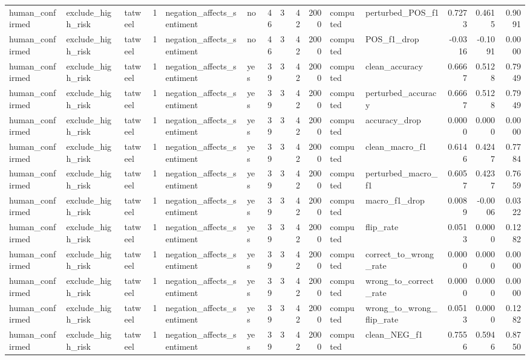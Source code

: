 \begin{tabular}{lllrllrrrrllrrr}
human_confirmed & exclude_high_risk & tatweel & 1 & negation_affects_sentiment & no & 46 & 3 & 42 & 2000 & computed & perturbed_POS_f1 & 0.7273 & 0.4615 & 0.9091 \\
human_confirmed & exclude_high_risk & tatweel & 1 & negation_affects_sentiment & no & 46 & 3 & 42 & 2000 & computed & POS_f1_drop & -0.0316 & -0.1091 & 0.0000 \\
human_confirmed & exclude_high_risk & tatweel & 1 & negation_affects_sentiment & yes & 39 & 3 & 42 & 2000 & computed & clean_accuracy & 0.6667 & 0.5128 & 0.7949 \\
human_confirmed & exclude_high_risk & tatweel & 1 & negation_affects_sentiment & yes & 39 & 3 & 42 & 2000 & computed & perturbed_accuracy & 0.6667 & 0.5128 & 0.7949 \\
human_confirmed & exclude_high_risk & tatweel & 1 & negation_affects_sentiment & yes & 39 & 3 & 42 & 2000 & computed & accuracy_drop & 0.0000 & 0.0000 & 0.0000 \\
human_confirmed & exclude_high_risk & tatweel & 1 & negation_affects_sentiment & yes & 39 & 3 & 42 & 2000 & computed & clean_macro_f1 & 0.6146 & 0.4247 & 0.7784 \\
human_confirmed & exclude_high_risk & tatweel & 1 & negation_affects_sentiment & yes & 39 & 3 & 42 & 2000 & computed & perturbed_macro_f1 & 0.6057 & 0.4237 & 0.7659 \\
human_confirmed & exclude_high_risk & tatweel & 1 & negation_affects_sentiment & yes & 39 & 3 & 42 & 2000 & computed & macro_f1_drop & 0.0089 & -0.0006 & 0.0322 \\
human_confirmed & exclude_high_risk & tatweel & 1 & negation_affects_sentiment & yes & 39 & 3 & 42 & 2000 & computed & flip_rate & 0.0513 & 0.0000 & 0.1282 \\
human_confirmed & exclude_high_risk & tatweel & 1 & negation_affects_sentiment & yes & 39 & 3 & 42 & 2000 & computed & correct_to_wrong_rate & 0.0000 & 0.0000 & 0.0000 \\
human_confirmed & exclude_high_risk & tatweel & 1 & negation_affects_sentiment & yes & 39 & 3 & 42 & 2000 & computed & wrong_to_correct_rate & 0.0000 & 0.0000 & 0.0000 \\
human_confirmed & exclude_high_risk & tatweel & 1 & negation_affects_sentiment & yes & 39 & 3 & 42 & 2000 & computed & wrong_to_wrong_flip_rate & 0.0513 & 0.0000 & 0.1282 \\
human_confirmed & exclude_high_risk & tatweel & 1 & negation_affects_sentiment & yes & 39 & 3 & 42 & 2000 & computed & clean_NEG_f1 & 0.7556 & 0.5946 & 0.8750 \\

\end{tabular}
